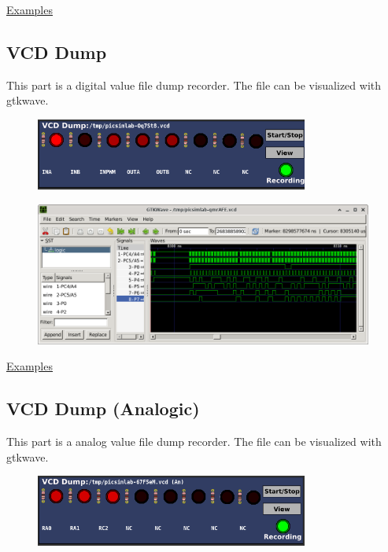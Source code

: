 \href{https://lcgamboa.github.io/picsimlab_examples/Parts.html\#Signal_Generator}{Examples}

\subsection{VCD Dump}

This part is a digital value file dump recorder. The file can be visualized with gtkwave. 

\begin{figure}[H]
\center
\includegraphics[width=0.8\textwidth]{img/part_vcd_dump.png} 
\end{figure}



\begin{figure}[H]
\center
\includegraphics[width=0.99\textwidth]{img/part_vcd_dump_gtkwave.png} 
\end{figure}

\href{https://lcgamboa.github.io/picsimlab_examples/Parts.html\#VCD_Dump}{Examples}


\subsection{VCD Dump (Analogic)}


This part is a analog value file dump recorder. The file can be visualized with gtkwave.  

\begin{figure}[H]
\center
\includegraphics[width=0.8\textwidth]{img/part_vcd_dump_an.png} 
\end{figure}



